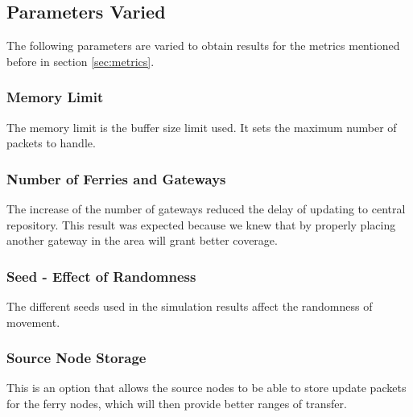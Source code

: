 \subsection{Parameters Varied} %
The following parameters are varied to obtain results for the metrics mentioned before in section \ref{sec:metrics}.
  
\subsubsection{Memory Limit}
The memory limit is the buffer size limit used.
It sets the maximum number of packets to handle.  

\subsubsection{Number of Ferries and Gateways}
The increase of the number of gateways reduced the delay of updating to central repository.  
This result was expected because we knew that by properly placing another gateway in the area will grant better coverage.  

\subsubsection{Seed - Effect of Randomness}
The different seeds used in the simulation results affect the randomness of movement.  

\subsubsection{Source Node Storage}
\label{sec:source_node_storage}
This is an option that allows the source nodes to be able to store update packets for the ferry nodes, which will then provide better ranges of transfer.
